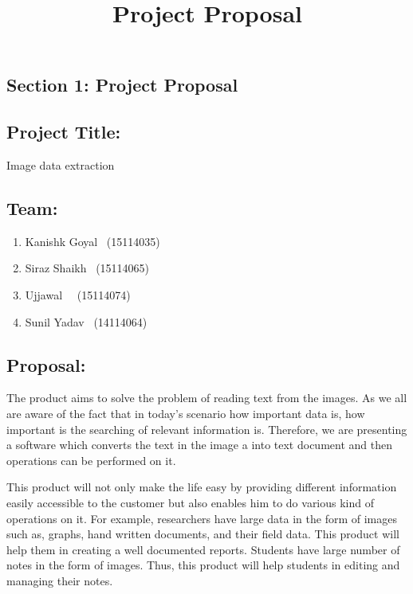 \documentclass[18 pt]{article}
\begin{document}
\begin{large}

\title{\textbf{Project Proposal}}
\author{}
\date{}
\maketitle



\section*{Section 1: Project Proposal}	



\subsection*{Project Title: } Image data extraction
\subsection*{Team: }

\begin{enumerate}
\item Kanishk Goyal \	(15114035)
		
\item Siraz Shaikh 	\	(15114065)
		
\item Ujjawal 	\	\	(15114074)
		
\item Sunil Yadav 	\	(14114064)
\end{enumerate}

\subsection*{Proposal:}
The product aims to solve the problem of reading text from the images. As we all are aware of the fact that in today’s scenario how important data is, how important is the searching of relevant information is. Therefore, we are presenting a software which converts the text in the image a into text document and then operations can be performed on it.


This product will not only make the life easy by providing different information easily accessible to the customer but also enables him to do various kind of operations on it. For example, researchers have large data in the form of images such as, graphs, hand written documents, and their field data. This product will help them in creating a well documented reports. Students have large number of notes in the form of images. Thus, this product will help students in editing and managing their notes.


\end{large}
\end{document}
